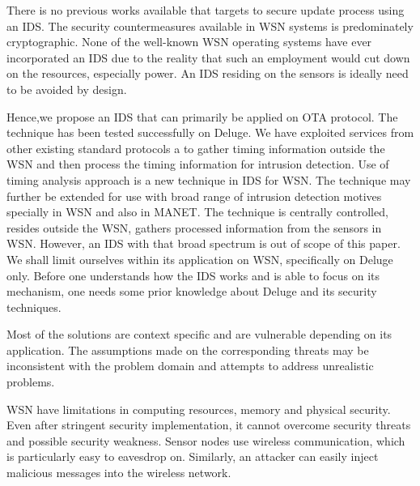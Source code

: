 \documentclass[conference,final]{IEEEtran}
\newcommand{\dme}[2]{\pdfmarkupcomment[markup=Highlight,color=yellow]{#1}{#2}}
\begin{document}
There is no previous works available that targets to secure update process using an IDS.
The security countermeasures available in WSN systems is predominately cryptographic.
None of the well-known WSN operating systems have ever incorporated an IDS due to the reality that such an employment would cut down on the resources, especially power.
An IDS residing on the sensors is ideally need to be avoided by design.

Hence,we propose an IDS that can primarily be applied on OTA protocol.
The technique has been tested successfully on Deluge.
We have exploited services from other existing standard protocols a to gather timing information outside the WSN and then process the timing information for intrusion detection.
Use of timing analysis approach is a new technique in IDS for WSN.
The technique may further be extended for use with broad range of intrusion detection motives specially in WSN and also in MANET.
The technique is centrally controlled, resides outside the WSN, gathers processed information from the sensors in WSN.
However, an IDS with that broad spectrum is out of scope of this paper.
We shall limit ourselves within its application on WSN, specifically on Deluge only.
Before one understands how the IDS works and is able to focus on its  mechanism, one needs some prior knowledge about Deluge and its security techniques.



Most of the solutions are context specific and are vulnerable depending on its application.
The assumptions made on the corresponding threats may be inconsistent with the problem domain and attempts to address unrealistic problems.

WSN have limitations in computing resources, memory and physical security. 
Even after stringent security implementation, it cannot overcome security threats and possible security weakness. 
Sensor nodes use wireless communication, which is particularly easy to eavesdrop on. Similarly, an attacker can easily inject malicious messages into the wireless network.
\end{document}
